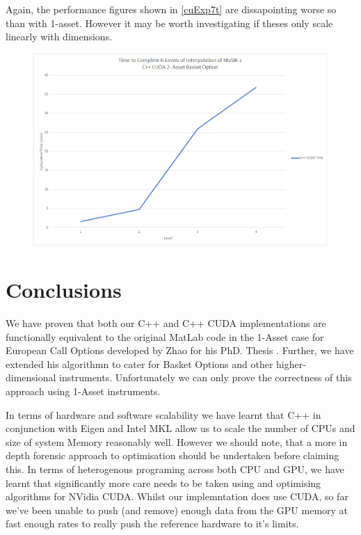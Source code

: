\documentclass[a4paper]{amsart}
\begin{document}
Again, the performance figures shown in \ref{cuExp7t} are dissapointing worse so than with 1-asset. However it may be worth investigating if theses only scale linearly with dimensions.

\begin{figure}[h]
\centering
\includegraphics[scale=0.3]{cuExp7-time.png}
\caption {}
\label {fig:cuExp7t}
\end{figure}

\newpage
\section {Conclusions}

We have proven that both our C++ and C++ CUDA implementations are functionally equivalent to the original MatLab code in the 1-Asset case for European Call Options developed by Zhao for his PhD. Thesis \cite{mski0}. Further, we have extended his algorithmn to cater for Basket Options and other higher-dimensional instruments. Unfortunately we can only prove the correctness of this approach using 1-Asset instruments. 

In terms of hardware and software scalability we have learnt that C++ in conjunction with Eigen and Intel MKL allow us to scale the number of CPUs and size of system Memory reasonably well. However we should note, that a more in depth forensic approach to optimisation should be undertaken before claiming this. In terms of heterogenous programing across both CPU and GPU, we have learnt that significantly more care needs to be taken using and optimising algorithms for NVidia CUDA. Whilst our implemntation does use CUDA, so far we've been unable to push (and remove) enough data from the GPU memory at fast enough rates to really push the reference hardware to it's limits.
\end{document}

